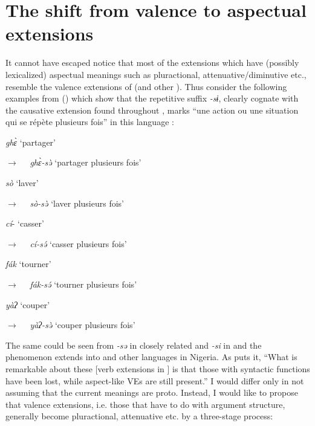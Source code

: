 \documentclass[output=paper]{langsci/langscibook}
\begin{document}
\section{The shift from valence to aspectual extensions}

It cannot have escaped notice that most of the extensions which have (possibly lexicalized) aspectual meanings such as pluractional, attenuative/diminutive etc., resemble the valence extensions of  (and other ). Thus consider the following examples from  () which show that the repetitive suffix \textit{-sɨ}, clearly cognate with the causative extension found throughout , marks “une action ou une situation qui se répète plusieurs fois” in this language \citep[243]{Nguendjio1989}:

\ea%
    \label{ex:proto:25}
  \parbox{3cm}{\textit{ghɛ̀ } ‘partager’} ${\rightarrow}$~~  \textit{ghɛ̀-sə̀}  ‘partager plusieurs fois’  \\
  \parbox{3cm}{\textit{sò}  ‘laver’}     ${\rightarrow}$~~  \textit{sò-sə̀ } ‘laver plusieurs fois’\\
  \parbox{3cm}{\textit{cí}-  ‘casser’}   ${\rightarrow}$~~  \textit{cí-sə́}  ‘casser plusieurs fois’\\
  \parbox{3cm}{\textit{fák } ‘tourner’}  ${\rightarrow}$~~  \textit{fák-sə́}  ‘tourner plusieurs fois’\\
  \parbox{3cm}{\textit{yàʔ } ‘couper’}   ${\rightarrow}$~~  \textit{yàʔ-sə̀ } ‘couper plusieurs fois’\\
\z

The same could be seen from \textit{-sə} in closely related  \citep[88]{Ndawouo1990} and \textit{-si} in  \citep{Ngangoum1970} and the phenomenon extends into  and other  languages in Nigeria. 
As \citet[5]{Gerhardt1988} puts it, “What is remarkable about these [verb extensions in ] is that those with syntactic functions have been lost, while aspect-like VEs are still present.” I would differ only in not assuming that the current meanings are proto. Instead, I would like to propose that valence extensions, i.e. those that have to do with argument structure, generally become pluractional, attenuative etc. by a three-stage process:

\end{document}

